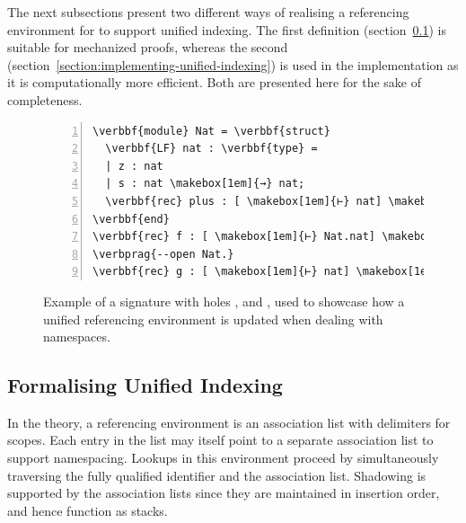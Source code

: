 The next subsections present two different ways of realising a referencing environment for \Beluga to support unified indexing.
The first definition (section~\ref{section:formalising-unified-indexing}) is suitable for mechanized proofs, whereas the second (section~\ref{section:implementing-unified-indexing}) is used in the implementation as it is computationally more efficient.
Both are presented here for the sake of completeness.

\begin{figure}[H]
\begin{Verbatim}[commandchars=\\\{\}, baselinestretch=1, numbers=left]
\verbbf{module} Nat = \verbbf{struct}
  \verbbf{LF} nat : \verbbf{type} =
  | z : nat
  | s : nat \makebox[1em]{→} nat;
  \verbbf{rec} plus : [ \makebox[1em]{⊢} nat] \makebox[1em]{→} [ \makebox[1em]{⊢} nat] \makebox[1em]{→} [ \makebox[1em]{⊢} nat] = \verbhole{?h1};
\verbbf{end}
\verbbf{rec} f : [ \makebox[1em]{⊢} Nat.nat] \makebox[1em]{→} [ \makebox[1em]{⊢} Nat.nat] = \verbhole{?h2};
\verbprag{--open Nat.}
\verbbf{rec} g : [ \makebox[1em]{⊢} nat] \makebox[1em]{→} [ \makebox[1em]{⊢} nat] = \verbhole{?h3};
\end{Verbatim}
\caption[Example \Beluga signature with holes]{%
Example of a \Beluga signature with holes \texttt{}, \texttt{} and \texttt{}, used to showcase how a unified referencing environment is updated when dealing with namespaces.
}
\label{figure:referencing-environment-example}
\end{figure}

\subsection{Formalising Unified Indexing}\label{section:formalising-unified-indexing}

In the theory, a referencing environment is an association list with delimiters for scopes.
Each entry in the list may itself point to a separate association list to support namespacing.
Lookups in this environment proceed by simultaneously traversing the fully qualified identifier and the association list.
Shadowing is supported by the association lists since they are maintained in insertion order, and hence function as stacks.

